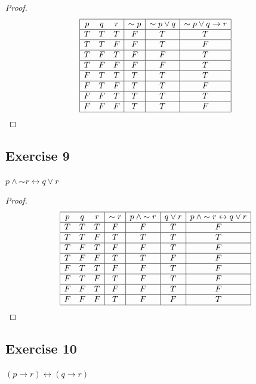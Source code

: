 \documentclass[14pt]{extarticle}
\newcommand{\bic}{\leftrightarrow}
\begin{document}
\begin{proof}
$$
\begin{array}{|ccc|c|c|c|}
\hline
p & q & r & {\sim p} & {\sim p} \vee q & {\sim p} \vee q \to r \\
\hline
T & T & T & F & T & T \\
\hline
T & T & F & F & T & F \\
\hline
T & F & T & F & F & T \\
\hline
T & F & F & F & F & T \\
\hline
F & T & T & T & T & T \\
\hline
F & T & F & T & T & F \\
\hline
F & F & T & T & T & T \\
\hline
F & F & F & T & T & F \\
\hline
\end{array}
$$
\end{proof}

\subsection{Exercise 9}
$p \wedge {\sim r} \bic q \vee r$

\begin{proof}
$$
\begin{array}{|ccc|c|c|c|c|}
\hline
p & q & r & {\sim r} & p \wedge {\sim r} & q \vee r & p \wedge {\sim r} \bic q
\vee r \\
\hline
T & T & T & F & F & T & F \\
\hline
T & T & F & T & T & T & T \\
\hline
T & F & T & F & F & T & F \\
\hline
T & F & F & T & T & F & F \\
\hline
F & T & T & F & F & T & F \\
\hline
F & T & F & T & F & T & F \\
\hline
F & F & T & F & F & T & F \\
\hline
F & F & F & T & F & F & T \\
\hline
\end{array}
$$
\end{proof}

\subsection{Exercise 10}
$(p \to r) \bic (q \to r)$
\end{document}
